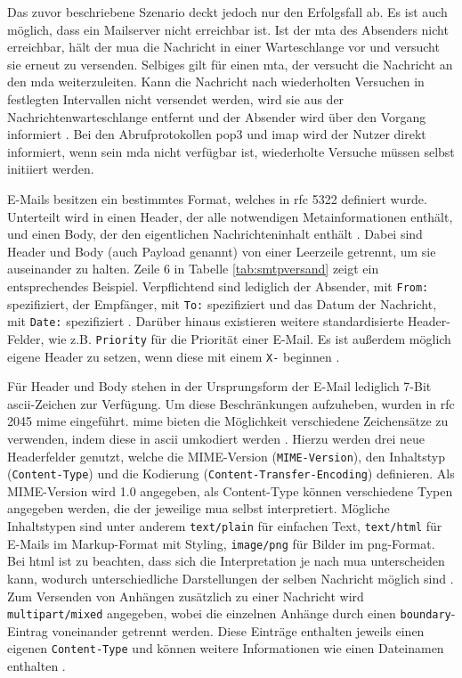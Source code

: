 Das zuvor beschriebene Szenario deckt jedoch nur den Erfolgsfall ab. Es ist auch möglich, dass ein Mailserver nicht erreichbar ist. Ist der \acrshort{mta} des Absenders nicht erreichbar, hält der \acrshort{mua} die Nachricht in einer Warteschlange vor und versucht sie erneut zu versenden. Selbiges gilt für einen \acrshort{mta}, der versucht die Nachricht an den \acrshort{mda} weiterzuleiten. Kann die Nachricht nach wiederholten Versuchen in festlegten Intervallen nicht versendet werden, wird sie aus der Nachrichtenwarteschlange entfernt und der Absender wird über den Vorgang informiert \citep[S. 144 f.]{Kurose2014}. Bei den Abrufprotokollen \acrshort{pop3} und \acrshort{imap} wird der Nutzer direkt informiert, wenn sein \acrshort{mda} nicht verfügbar ist, wiederholte Versuche müssen selbst initiiert werden.

E-Mails besitzen ein bestimmtes Format, welches in \acrshort{rfc} 5322 definiert wurde. Unterteilt wird in einen Header, der alle notwendigen Metainformationen enthält, und einen Body, der den eigentlichen Nachrichteninhalt enthält \citep[S. 6 ff.]{RFC5322}. Dabei sind Header und Body (auch Payload genannt) von einer Leerzeile getrennt, um sie auseinander zu halten. Zeile 6 in Tabelle \ref{tab:smtpversand} zeigt ein entsprechendes Beispiel. Verpflichtend sind lediglich der Absender, mit \texttt{From:} spezifiziert, der Empfänger, mit \texttt{To:} spezifiziert und das Datum der Nachricht, mit \texttt{Date:} spezifiziert \citep[S. 18]{RFC5322}. Darüber hinaus existieren weitere standardisierte Header-Felder, wie z.B. \texttt{Priority} für die Priorität einer E-Mail.  Es ist außerdem möglich eigene Header zu setzen, wenn diese mit einem \texttt{X-} beginnen \citep[S. 24]{RFC822}. 

Für Header und Body stehen in der Ursprungsform der E-Mail lediglich 7-Bit \acrshort{ascii}-Zeichen zur Verfügung. Um diese Beschränkungen aufzuheben, wurden in \acrshort{rfc} 2045 \acrfull{mime} eingeführt. \acrshort{mime} bieten die Möglichkeit verschiedene Zeichensätze zu verwenden, indem diese in \acrshort{ascii} umkodiert werden \citep[S. 3 f.]{RFC2045}. Hierzu werden drei neue Headerfelder genutzt, welche die MIME-Version (\texttt{MIME-Version}), den Inhaltstyp (\texttt{Content-Type}) und die Kodierung (\texttt{Content-Transfer-Encoding}) definieren. Als MIME-Version wird 1.0 angegeben, als Content-Type können verschiedene Typen angegeben werden, die der jeweilige \acrshort{mua} selbst interpretiert. Mögliche Inhaltstypen sind unter anderem \texttt{text/plain} für einfachen Text, \texttt{text/html} für E-Mails im Markup-Format mit Styling, \texttt{image/png} für Bilder im \acrshort{png}-Format. Bei \acrshort{html} ist zu beachten, dass sich die Interpretation je nach \acrshort{mua} unterscheiden kann, wodurch unterschiedliche Darstellungen der selben Nachricht möglich sind \citep[S. 6 f.]{RFC2046}. Zum Versenden von Anhängen zusätzlich zu einer Nachricht wird \texttt{multipart/mixed} angegeben, wobei die einzelnen Anhänge durch einen \texttt{boundary}-Eintrag voneinander getrennt werden. Diese Einträge enthalten jeweils einen eigenen \texttt{Content-Type} und können weitere Informationen wie einen Dateinamen enthalten \citep[S. 268 f.]{Zisler2014}. 

